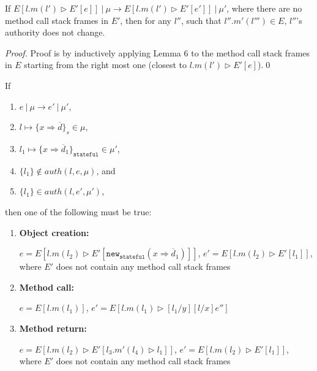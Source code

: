 \documentclass{llncs}
\newcommand{\keywadj}[1]{\mathtt{#1}}
\begin{document}
\begin{lemma} If 
\mbox{$E[l.m(l') \rhd E'[e]]~|~\mu \longrightarrow E[l.m(l') \rhd E'[e']]~|~\mu'$}, where there are no method call stack frames in $E'$, then for any $l''$, such that $l''.m'(l''') \in E$, $l''$'s authority does not change.
\end{lemma}

\begin{proof}
Proof is by inductively applying Lemma 6 to the method call stack frames in $E$ starting from the right most one (closest to $l.m(l') \rhd E'[e]$).\qed
\end{proof}


\newpage

\begin{theorem} If
\begin{enumerate}
\item $e~|~\mu \longrightarrow e'~|~\mu'$,
\item $l \mapsto \{ x \Rightarrow \overline{d} \}_s \in \mu$,
\item $l_1 \mapsto \{ x \Rightarrow \overline{d}_1 \}_{\keywadj{stateful}} \in \mu'$,
\item $\{ l_1 \} \not\in auth(l, e, \mu)$, and
\item $\{ l_1 \} \in auth(l, e', \mu')$,
\end{enumerate}
then one of the following must be true:
\begin{enumerate}
\item \textbf{Object creation:}

$e = E[l.m(l_2) \rhd E'[\keywadj{new}_{\keywadj{stateful}}(x \Rightarrow \overline{d}_1)]]$, $e' = E[l.m(l_2) \rhd E'[l_1]]$, where $E'$ does not contain any method call stack frames

\item \textbf{Method call:}

$e = E[l.m(l_1)]$, $e' = E[l.m(l_1) \rhd [l_1/y][l/x]e'']$

\item \textbf{Method return:}

$e = E[l.m(l_2) \rhd E'[l_3.m'(l_4) \rhd l_1]]$, $e' = E[l.m(l_2) \rhd E'[l_1]]$, where $E'$ does not contain any method call stack frames
\end{enumerate}

\end{theorem}
\end{document}
